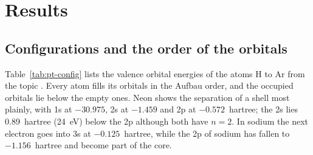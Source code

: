 \section{Results}

\subsection{Configurations and the order of the orbitals}
Table~\ref{tab:pt-config} lists the valence orbital energies of the atoms H to Ar from the topic . Every atom fills its orbitals in the Aufbau order, and the occupied orbitals lie below the empty ones. Neon shows the separation of a shell most plainly, with 1s at $-30.975$, 2s at $-1.459$ and 2p at $-0.572$~hartree; the 2s lies 0.89~hartree (24~eV) below the 2p although both have $n = 2$. In sodium the next electron goes into 3s at $-0.125$~hartree, while the 2p of sodium has fallen to $-1.156$~hartree and become part of the core.


